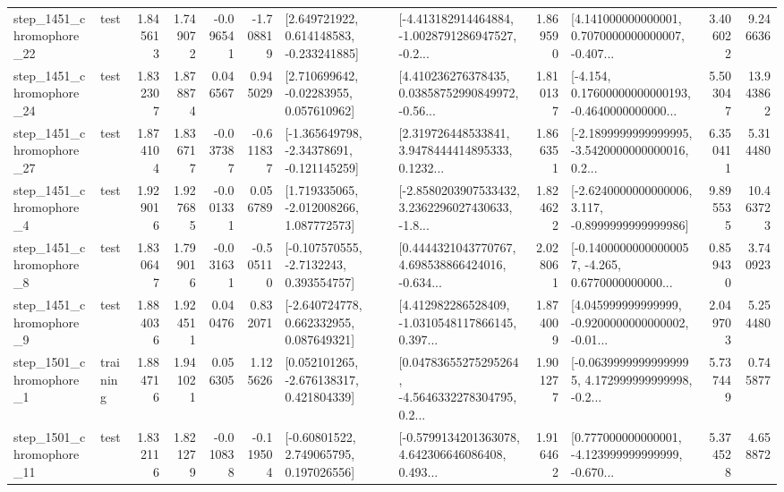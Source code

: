 \begin{tabular}{llrrrrllrlrr}
 step\_1451\_chromophore\_22 &      test &      1.845613 &    1.749072 &     -0.096541 & -1.708819 &    [2.649721922, 0.614148583, -0.233241885] &  [-4.413182914464884, -1.0028791286947527, -0.2... &       1.869590 &  [4.141000000000001, 0.7070000000000007, -0.407... &            3.406022 &          9.246636 \\
 step\_1451\_chromophore\_24 &      test &      1.832307 &    1.878874 &      0.046567 &  0.945029 &     [2.710699642, -0.02283955, 0.057610962] &  [4.410236276378435, 0.03858752990849972, -0.56... &       1.810137 &  [-4.154, 0.17600000000000193, -0.4640000000000... &            5.503047 &         13.943862 \\
 step\_1451\_chromophore\_27 &      test &      1.874104 &    1.836717 &     -0.037387 & -0.611837 &   [-1.365649798, -2.34378691, -0.121145259] &  [2.319726448533841, 3.9478444414895333, 0.1232... &       1.866351 &  [-2.1899999999999995, -3.5420000000000016, 0.2... &            6.350411 &          5.314480 \\
  step\_1451\_chromophore\_4 &      test &      1.929016 &    1.927685 &     -0.001331 &  0.056789 &    [1.719335065, -2.012008266, 1.087772573] &  [-2.8580203907533432, 3.2362296027430633, -1.8... &       1.824622 &  [-2.6240000000000006, 3.117, -0.8999999999999986] &            9.895535 &         10.463723 \\
  step\_1451\_chromophore\_8 &      test &      1.830647 &    1.799016 &     -0.031631 & -0.505110 &     [-0.107570555, -2.7132243, 0.393554757] &  [0.4444321043770767, 4.698538866424016, -0.634... &       2.028061 &  [-0.14000000000000057, -4.265, 0.6770000000000... &            0.859430 &          3.740923 \\
  step\_1451\_chromophore\_9 &      test &      1.884036 &    1.924511 &      0.040476 &  0.832071 &    [-2.640724778, 0.662332955, 0.087649321] &  [4.412982286528409, -1.0310548117866145, 0.397... &       1.874009 &  [4.045999999999999, -0.9200000000000002, -0.01... &            2.049703 &          5.254480 \\
  step\_1501\_chromophore\_1 &  training &      1.884716 &    1.941021 &      0.056305 &  1.125626 &    [0.052101265, -2.676138317, 0.421804339] &  [0.04783655275295264, -4.5646332278304795, 0.2... &       1.901277 &  [-0.06399999999999995, 4.172999999999998, -0.2... &            5.737449 &          0.745877 \\
 step\_1501\_chromophore\_11 &      test &      1.832116 &    1.821279 &     -0.010838 & -0.119504 &     [-0.60801522, 2.749065795, 0.197026556] &  [-0.5799134201363078, 4.642306646086408, 0.493... &       1.916462 &  [0.777000000000001, -4.123999999999999, -0.670... &            5.374528 &          4.658872 \\

\end{tabular}
